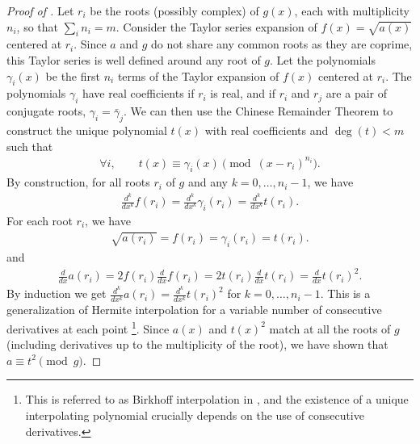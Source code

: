 \documentclass[final,onefignum,onetabnum]{siamart220329}
\begin{document}
\begin{proof}[Proof of ]
  Let $r_i$ be the roots (possibly complex) of $g(x)$,
  each with multiplicity $n_i$, so that $\sum_i n_i = m$. Consider the Taylor
  series expansion of $f(x) = \sqrt{a(x)}$ centered at $r_i$. Since $a$ and $g$
  do not share any common roots as they are coprime, this Taylor series is well
  defined around any root of $g$. Let the polynomials $\gamma_i(x)$ be the first
  $n_i$ terms of the Taylor expansion of $f(x)$ centered at $r_i$. The
  polynomials $\gamma_i$ have real coefficients if $r_i$ is real, and if $r_i$
  and $r_j$ are a pair of conjugate roots, $\gamma_i = \bar{\gamma}_j$. We can
  then use the Chinese Remainder Theorem \cite[Section 7.6]{dummit2003abstract}
  to construct the unique polynomial $t(x)$ with real coefficients and
  $\deg(t) < m$ such that
  \begin{align*}
    \forall i, \qquad t(x) \equiv \gamma_i(x) \pmod{(x - r_i)^{n_i}}.
  \end{align*}
  By construction, for all roots $r_i$ of $g$ and any $k = 0, \ldots, n_i-1$, we have
  \begin{align*}
    \frac{d^k}{dx^k} f(r_i) = \frac{d^k}{dx^k} \gamma_i(r_i) = \frac{d^k}{dx^k} t(r_i).
  \end{align*}
  For each root $r_i$, we have
  \begin{align*}
    \sqrt{a(r_i)} = f(r_i) = \gamma_i(r_i) = t(r_i).
  \end{align*}
  and
  \begin{align*}
    \frac{d}{dx} a(r_i) = 2 f(r_i) \frac{d}{dx} f(r_i) = 2 t(r_i) \frac{d}{dx} t(r_i)
    = \frac{d}{dx} t(r_i)^2.
  \end{align*}
  By induction we get $\frac{d^k}{dx^k}a(r_i) = \frac{d^k}{dx^k}t(r_i)^2$ for
  $k = 0, \ldots, n_i-1$. This is a generalization of Hermite interpolation
  for a variable number of consecutive derivatives at each point \cite[section
  17.6]{hamming1973numericalmethods}\footnote{This is referred to as Birkhoff
    interpolation in \cite{hamming1973numericalmethods}, and the existence of
    a unique interpolating polynomial crucially depends on the use of
    consecutive derivatives.}. Since $a(x)$ and $t(x)^2$ match at all the roots of $g$
  (including derivatives up to the multiplicity of the root), we have shown that $a \equiv t^2 \pmod{g}$.
\end{proof}
\end{document}
